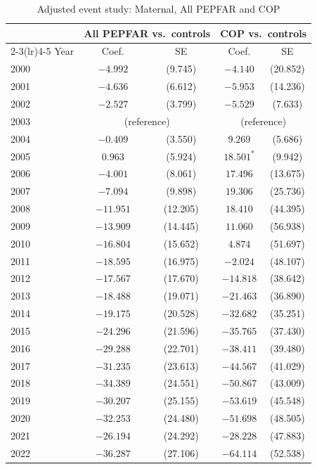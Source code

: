 \begin{table}[htbp]
\centering
\small
\caption{Adjusted event study: Maternal, All PEPFAR and COP}
\label{tab:es_combined_mort_maternal}
\begin{tabular}{lcccc}
\toprule
 & \multicolumn{2}{c}{All PEPFAR vs.\ controls} & \multicolumn{2}{c}{COP vs.\ controls} \\
\cmidrule(lr){2-3}\cmidrule(lr){4-5}
Year & Coef. & SE & Coef. & SE \\
\midrule
2000 & $-4.992$ & (9.745) & $-4.140$ & (20.852) \\
2001 & $-4.636$ & (6.612) & $-5.953$ & (14.236) \\
2002 & $-2.527$ & (3.799) & $-5.529$ & (7.633) \\
2003 & \multicolumn{2}{c}{(reference)} & \multicolumn{2}{c}{(reference)} \\
2004 & $-0.409$ & (3.550) & $9.269$ & (5.686) \\
2005 & $0.963$ & (5.924) & $18.501^{*}$ & (9.942) \\
2006 & $-4.001$ & (8.061) & $17.496$ & (13.675) \\
2007 & $-7.094$ & (9.898) & $19.306$ & (25.736) \\
2008 & $-11.951$ & (12.205) & $18.410$ & (44.395) \\
2009 & $-13.909$ & (14.445) & $11.060$ & (56.938) \\
2010 & $-16.804$ & (15.652) & $4.874$ & (51.697) \\
2011 & $-18.595$ & (16.975) & $-2.024$ & (48.107) \\
2012 & $-17.567$ & (17.670) & $-14.818$ & (38.642) \\
2013 & $-18.488$ & (19.071) & $-21.463$ & (36.890) \\
2014 & $-19.175$ & (20.528) & $-32.682$ & (35.251) \\
2015 & $-24.296$ & (21.596) & $-35.765$ & (37.430) \\
2016 & $-29.288$ & (22.701) & $-38.411$ & (39.480) \\
2017 & $-31.235$ & (23.613) & $-44.567$ & (41.029) \\
2018 & $-34.389$ & (24.551) & $-50.867$ & (43.009) \\
2019 & $-30.207$ & (25.155) & $-53.619$ & (45.548) \\
2020 & $-32.253$ & (24.480) & $-51.698$ & (48.505) \\
2021 & $-26.194$ & (24.292) & $-28.228$ & (47.883) \\
2022 & $-36.287$ & (27.106) & $-64.114$ & (52.538) \\

\end{tabular}
\end{table}
